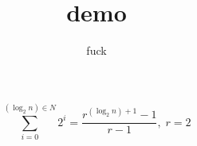 \documentclass{article}
\title{demo}
\author{fuck}
\begin{document}
\maketitle

$$ \sum_{i=0}^{(\log_{2}n) \in N} 2^{i} =\frac{r^{(\log_{2}n)+1}-1}{r-1},\; r= 2$$
\end{document}

